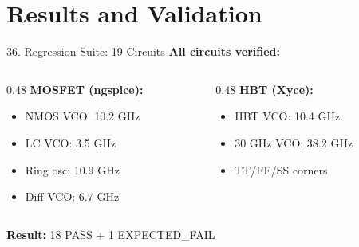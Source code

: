 \documentclass[aspectratio=169, 11pt]{beamer}
\begin{document}

\section{Results and Validation}

\begin{frame}{36. Regression Suite: 19 Circuits}
    \textbf{All circuits verified:}

    \vspace{0.5em}
    \begin{columns}[T]
        \begin{column}{0.48\textwidth}
            \textbf{MOSFET (ngspice):}
            \begin{itemize}
                \item NMOS VCO: 10.2 GHz
                \item LC VCO: 3.5 GHz
                \item Ring osc: 10.9 GHz
                \item Diff VCO: 6.7 GHz
            \end{itemize}
        \end{column}
        \begin{column}{0.48\textwidth}
            \textbf{HBT (Xyce):}
            \begin{itemize}
                \item HBT VCO: 10.4 GHz
                \item 30 GHz VCO: 38.2 GHz
                \item TT/FF/SS corners
            \end{itemize}
        \end{column}
    \end{columns}

    \vspace{0.5em}
    \textbf{Result:} 18 PASS + 1 EXPECTED\_FAIL
\end{frame}
\end{document}
